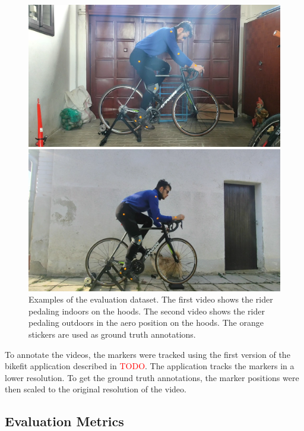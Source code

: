 \begin{figure}[htbp]

    \centering
    \includegraphics[width=1\linewidth]{obrazky-figures/eval_dataset_in_hoods.png}

    \includegraphics[width=1\linewidth]{obrazky-figures/eval_dataset_out_aero.png}

    \caption{Examples of the evaluation dataset. The first video shows the rider pedaling indoors on the hoods. The second video shows the rider pedaling outdoors in the aero position on the hoods. The orange stickers are used as ground truth annotations.}


    \label{fig:evaluation_markers}
\end{figure}

To annotate the videos, the markers were tracked using the first version of the bikefit application described in \textcolor{red}{TODO}. The application tracks the markers in a lower resolution. To get the ground truth annotations, the marker positions were then scaled to the original resolution of the video.

\subsection{Evaluation Metrics}
\label{evaluation_metrics}

